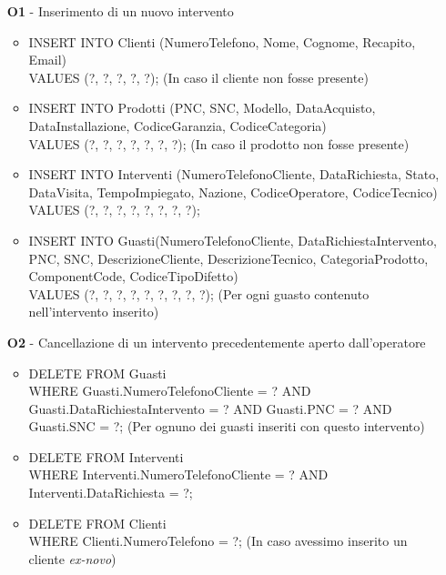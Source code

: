 \documentclass[a4paper, 12pt]{report}
\begin{document}
\begin{itemize}
	\item[\textbf{O1} -] Inserimento di un nuovo intervento
		\begin{itemize}[leftmargin=*, topsep=0pt]
			\item INSERT INTO Clienti (NumeroTelefono, Nome, Cognome, Recapito, Email) \\VALUES (?, ?, ?, ?, ?);
				\subitem (In caso il cliente non fosse presente)\newline
			\item INSERT INTO Prodotti (PNC, SNC, Modello, DataAcquisto, DataInstallazione, CodiceGaranzia, CodiceCategoria) \\VALUES (?, ?, ?, ?, ?, ?, ?);
				\subitem (In caso il prodotto non fosse presente)\newline
			\item INSERT INTO Interventi (NumeroTelefonoCliente, DataRichiesta, Stato, DataVisita, TempoImpiegato, Nazione, CodiceOperatore, CodiceTecnico) \\VALUES (?, ?, ?, ?, ?, ?, ?, ?);\newline			
			\item INSERT INTO Guasti(NumeroTelefonoCliente, DataRichiestaIntervento, PNC, SNC, DescrizioneCliente, DescrizioneTecnico, CategoriaProdotto, ComponentCode, CodiceTipoDifetto) \\VALUES (?, ?, ?, ?, ?, ?, ?, ?, ?);
				\subitem (Per ogni guasto contenuto nell'intervento inserito)
		\end{itemize}
	\item[\textbf{O2} -] Cancellazione di un intervento precedentemente aperto dall'operatore
		\begin{itemize}[leftmargin=*, topsep=0pt]
			\item DELETE FROM Guasti \\WHERE Guasti.NumeroTelefonoCliente = ? AND Guasti.DataRichiestaIntervento = ? AND Guasti.PNC = ? AND Guasti.SNC = ?;
				\subitem (Per ognuno dei guasti inseriti con questo intervento)\newline
			\item DELETE FROM Interventi \\WHERE Interventi.NumeroTelefonoCliente = ? AND Interventi.DataRichiesta = ?;\newline
			\item DELETE FROM Clienti \\WHERE Clienti.NumeroTelefono = ?;
				\subitem (In caso avessimo inserito un cliente \textit{ex-novo})\newline

\end{itemize}
\end{itemize}
\end{document}
